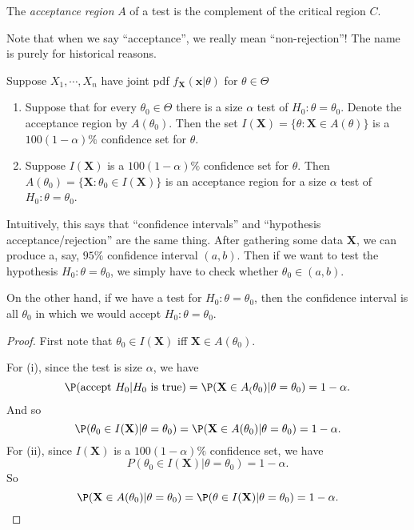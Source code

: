\documentclass[a4paper]{article}
\begin{document}
\begin{defi}
  The \emph{acceptance region} $A$ of a test is the complement of the critical region $C$.

  Note that when we say ``acceptance'', we really mean ``non-rejection''! The name is purely for historical reasons.
\end{defi}
Suppose $X_1, \cdots, X_n$ have joint pdf $f_\mathbf{X}(\mathbf{x}|\theta)$ for $\theta\in \Theta$

\begin{thm}[]\leavevmode
  \begin{enumerate}
    \item Suppose that for every $\theta_0\in \Theta$ there is a size $\alpha$ test of $H_0: \theta = \theta_0$. Denote the acceptance region by $A(\theta_0)$. Then the set $I(\mathbf{X}) = \{\theta:\mathbf{X}\in A(\theta)\}$ is a $100(1 - \alpha)\%$ confidence set for $\theta$.
    \item Suppose $I(\mathbf{X})$ is a $100(1 - \alpha)\%$ confidence set for $\theta$. Then $A(\theta_0) = \{\mathbf{X}: \theta_0 \in I(\mathbf{X})\}$ is an acceptance region for a size $\alpha$ test of $H_0: \theta = \theta_0$.
  \end{enumerate}
\end{thm}
Intuitively, this says that ``confidence intervals'' and ``hypothesis acceptance/rejection'' are the same thing. After gathering some data $\mathbf{X}$, we can produce a, say, $95\%$ confidence interval $(a, b)$. Then if we want to test the hypothesis $H_0: \theta = \theta_0$, we simply have to check whether $\theta_0 \in (a, b)$.

On the other hand, if we have a test for $H_0: \theta = \theta_0$, then the confidence interval is all $\theta_0$ in which we would accept $H_0: \theta = \theta_0$.
\begin{proof}
  First note that $\theta_0\in I(\mathbf{X})$ iff $\mathbf{X}\in A(\theta_0)$.

  For (i), since the test is size $\alpha$, we have
  \[
    \P(\text{accept }H_0|H_0\text{ is true}) = \P(\mathbf{X}\in A_(\theta_0)|\theta=\theta_0) = 1 - \alpha.
  \]
  And so
  \[
    \P(\theta_0\in I(\mathbf{X})|\theta = \theta_0) = \P(\mathbf{X}\in A(\theta_0)|\theta = \theta_0) = 1 - \alpha.
  \]
  For (ii), since $I(\mathbf{X})$ is a $100(1 - \alpha)\%$ confidence set, we have
  \[
    P(\theta_0\in I(\mathbf{X})| \theta = \theta_0) = 1- \alpha.
  \]
  So
  \[
    \P(\mathbf{X}\in A(\theta_0)|\theta = \theta_0) = \P(\theta\in I(\mathbf{X})|\theta = \theta_0) = 1- \alpha.
  \]
\end{proof}
\end{document}
